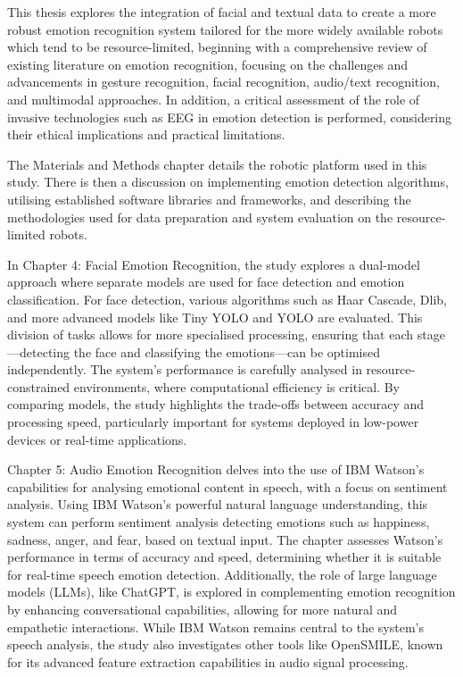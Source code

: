This thesis explores the integration of facial and textual data to create a more robust emotion recognition system tailored for the more widely available robots which tend to be resource-limited, beginning with a comprehensive review of existing literature on emotion recognition, focusing on the challenges and advancements in gesture recognition, facial recognition, audio/text recognition, and multimodal approaches. In addition, a critical assessment of the role of invasive technologies such as EEG in emotion detection is performed, considering their ethical implications and practical limitations.

The Materials and Methods chapter details the robotic platform used in this study. There is then a discussion on implementing emotion detection algorithms, utilising established software libraries and frameworks, and describing the methodologies used for data preparation and system evaluation on the resource-limited robots.

In Chapter 4: Facial Emotion Recognition, the study explores a dual-model approach where separate models are used for face detection and emotion classification. For face detection, various algorithms such as Haar Cascade, Dlib, and more advanced models like Tiny YOLO and YOLO are evaluated. This division of tasks allows for more specialised processing, ensuring that each stage—detecting the face and classifying the emotions—can be optimised independently. The system's performance is carefully analysed in resource-constrained environments, where computational efficiency is critical. By comparing models, the study highlights the trade-offs between accuracy and processing speed, particularly important for systems deployed in low-power devices or real-time applications.

Chapter 5: Audio Emotion Recognition delves into the use of IBM Watson's capabilities for analysing emotional content in speech, with a focus on sentiment analysis. Using IBM Watson's powerful natural language understanding, this system can perform sentiment analysis detecting emotions such as happiness, sadness, anger, and fear, based on textual input. The chapter assesses Watson's performance in terms of accuracy and speed, determining whether it is suitable for real-time speech emotion detection. Additionally, the role of large language models (LLMs), like ChatGPT, is explored in complementing emotion recognition by enhancing conversational capabilities, allowing for more natural and empathetic interactions. While IBM Watson remains central to the system's speech analysis, the study also investigates other tools like OpenSMILE, known for its advanced feature extraction capabilities in audio signal processing.

